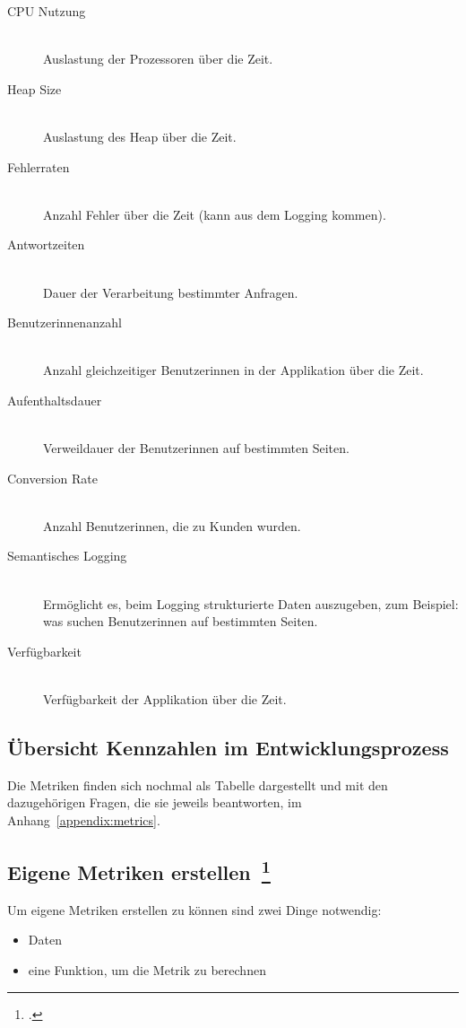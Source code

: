 \begin{description}
  \item[CPU Nutzung] \hfill \\ Auslastung der Prozessoren über die Zeit.
  \item[Heap Size] \hfill \\ Auslastung des Heap über die Zeit.
  \item[Fehlerraten] \hfill \\ Anzahl Fehler über die Zeit (kann aus dem Logging kommen).
  \item[Antwortzeiten] \hfill \\ Dauer der Verarbeitung bestimmter Anfragen.
  \item[Benutzerinnenanzahl] \hfill \\ Anzahl gleichzeitiger Benutzerinnen in der Applikation über die Zeit.
  \item[Aufenthaltsdauer] \hfill \\ Verweildauer der Benutzerinnen auf bestimmten Seiten.
  \item[Conversion Rate] \hfill \\ Anzahl Benutzerinnen, die zu Kunden wurden.
  \item[Semantisches Logging] \hfill \\ Ermöglicht es, beim Logging strukturierte Daten auszugeben, zum Beispiel: was suchen Benutzerinnen auf bestimmten Seiten.
  \item[Verfügbarkeit] \hfill \\ Verfügbarkeit der Applikation über die Zeit.
\end{description}

\subsection{Übersicht Kennzahlen im Entwicklungsprozess}

Die Metriken finden sich nochmal als Tabelle dargestellt und mit den dazugehörigen Fragen, die sie jeweils beantworten, im Anhang~\ref{appendix:metrics}.

\clearpage
\subsection[Eigene Metriken erstellen]{Eigene Metriken erstellen~\footcite[vgl.][S.127ff]{davis_agile_2015}}

Um eigene Metriken erstellen zu können sind zwei Dinge notwendig:
\begin{itemize}
  \item Daten
  \item eine Funktion, um die Metrik zu berechnen
\end{itemize}

